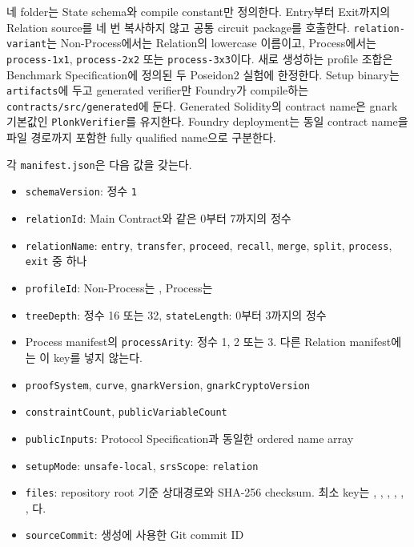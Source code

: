 \documentclass[11pt,a4paper]{extarticle}
\begin{document}
네  folder는 State schema와 compile constant만
정의한다. Entry부터 Exit까지의 Relation source를 네 번 복사하지 않고 공통 circuit
package를 호출한다. \texttt{relation-variant}는 Non-Process에서는 Relation의 lowercase
이름이고, Process에서는 \texttt{process-1x1}, \texttt{process-2x2} 또는
\texttt{process-3x3}이다. 새로 생성하는 profile 조합은 Benchmark Specification에 정의된
두 Poseidon2 실험에 한정한다. Setup binary는
\texttt{artifacts}에 두고 generated verifier만 Foundry가 compile하는
\texttt{contracts/src/generated}에 둔다. Generated Solidity의 contract name은 gnark
기본값인 \texttt{PlonkVerifier}를 유지한다. Foundry deployment는 동일 contract name을
파일 경로까지 포함한 fully qualified name으로 구분한다.

각 \texttt{manifest.json}은 다음 값을 갖는다.

\begin{itemize}
  \item \texttt{schemaVersion}: 정수 \texttt{1}
  \item \texttt{relationId}: Main Contract와 같은 0부터 7까지의 정수
  \item \texttt{relationName}: \texttt{entry}, \texttt{transfer}, \texttt{proceed},
        \texttt{recall}, \texttt{merge}, \texttt{split}, \texttt{process},
        \texttt{exit} 중 하나
  \item \texttt{profileId}: Non-Process는 , Process는
  \item \texttt{treeDepth}: 정수 16 또는 32, \texttt{stateLength}: 0부터 3까지의 정수
  \item Process manifest의 \texttt{processArity}: 정수 1, 2 또는 3.
        다른 Relation manifest에는 이 key를 넣지 않는다.
  \item \texttt{proofSystem}, \texttt{curve}, \texttt{gnarkVersion},
        \texttt{gnarkCryptoVersion}
  \item \texttt{constraintCount}, \texttt{publicVariableCount}
  \item \texttt{publicInputs}: Protocol Specification과 동일한 ordered name array
  \item \texttt{setupMode}: \texttt{unsafe-local}, \texttt{srsScope}: \texttt{relation}
  \item \texttt{files}: repository root 기준 상대경로와 SHA-256 checksum. 최소 key는
        , , ,
        , , ,
        다.
  \item \texttt{sourceCommit}: 생성에 사용한 Git commit ID
\end{itemize}
\end{document}
